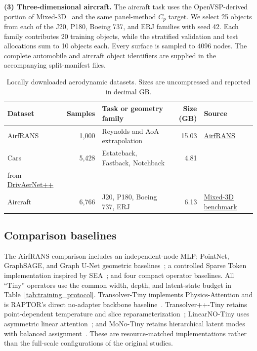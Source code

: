 \documentclass[a4paper,fleqn]{cas-sc}
\begin{document}
\textbf{(3) Three-dimensional aircraft.}
The aircraft task uses the OpenVSP-derived portion of Mixed-3D~\citep{ref18,ref37}
and the same panel-method \(C_p\) target. We select 25 objects from each
of the J20, P180, Boeing 737, and ERJ families with seed 42. Each family
contributes 20 training objects, while the stratified validation and test
allocations sum to 10 objects each. Every surface is sampled to 4096 nodes.
The complete automobile and aircraft object identifiers are supplied in
the accompanying split-manifest files.


\begin{table}[t]
	\centering
	\caption{Locally downloaded aerodynamic datasets.
		Sizes are uncompressed and reported in decimal GB.}
	\label{tab:dataset_overview}
	\small
	\renewcommand{\arraystretch}{1.15}
	\setlength{\tabcolsep}{5pt}
	\begin{tabular}{@{}lrlrl@{}}
		\toprule
		Dataset & Samples & Task or geometry family & Size (GB) & Source \\
		\midrule
		AirfRANS
		& 1,000
		& Reynolds and AoA extrapolation
		& 15.03
		& \href{https://github.com/Extrality/AirfRANS}{AirfRANS} \\
		
		Cars
		& 5,428
		& Estateback, Fastback, Notchback
		& 4.81
		& \shortstack[l]{
			\href{https://github.com/PKU-CMEGroup/NeuralOperator}{Mixed-3D}; automobiles derived\\
			from \href{https://dataverse.harvard.edu/dataverse/DrivAerNet}{DrivAerNet++}
		} \\
		
		Aircraft
		& 6,766
		& J20, P180, Boeing 737, ERJ
		& 6.13
		& \href{https://github.com/PKU-CMEGroup/NeuralOperator}{Mixed-3D benchmark} \\
		\bottomrule
	\end{tabular}
\end{table}



\subsection{Comparison baselines}
\label{subsec:baselines}

The AirfRANS comparison includes an independent-node MLP; PointNet, GraphSAGE,
and Graph U-Net geometric baselines~\citep{ref11,ref12,ref13}; a controlled
Sparse Token implementation inspired by SEA~\citep{ref36}; and four compact
operator baselines. All ``Tiny'' operators use the common width, depth, and
latent-state budget in Table~\ref{tab:training_protocol}. Transolver-Tiny
implements Physics-Attention and is RAPTOR's direct no-adapter backbone
baseline~\citep{ref20}. Transolver++-Tiny retains point-dependent temperature
and slice reparameterization~\citep{ref21}; LinearNO-Tiny uses asymmetric
linear attention~\citep{ref22}; and MoNo-Tiny retains hierarchical latent
modes with balanced assignment~\citep{ref23}. These are resource-matched
implementations rather than the full-scale configurations of the original
studies.
\end{document}
